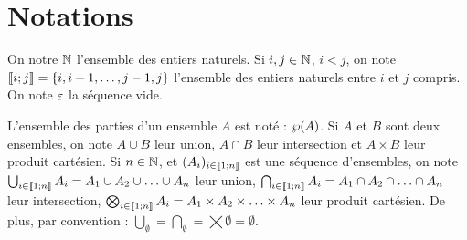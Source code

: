\section{Notations}

On notre $\mathbb{N}$ l'ensemble des entiers naturels.
Si $i, j \in \mathbb{N}$, $i < j$, on note $\llbracket i; j \rrbracket = \{ i, i+1, \ldots, j-1, j \}$
l'ensemble des entiers naturels entre $i$ et $j$ compris.
On note $\varepsilon$ la séquence vide.

L'ensemble des parties d'un ensemble $A$ est noté : $\wp(A)$.
Si $A$ et $B$ sont deux ensembles, on note
$A \cup B$ leur union, $A \cap B$ leur intersection et $A \times B$ leur produit cartésien.
Si $n \in \mathbb{N}$, et $(A_i)_{i \in \llbracket 1; n \rrbracket}$ est une séquence d'ensembles, on note
$\bigcup_{i \in \llbracket 1; n \rrbracket} A_i = A_1 \cup A_2 \cup \ldots \cup A_n$ leur union,
$\bigcap_{i \in \llbracket 1; n \rrbracket} A_i = A_1 \cap A_2 \cap \ldots \cap A_n$ leur intersection,
$\bigotimes_{i \in \llbracket 1; n \rrbracket} A_i = A_1 \times A_2 \times \ldots \times A_n$ leur produit cartésien.
De plus, par convention :
$\bigcup_{\emptyset} = \bigcap_{\emptyset} = \bigtimes{\emptyset} = \emptyset$.
